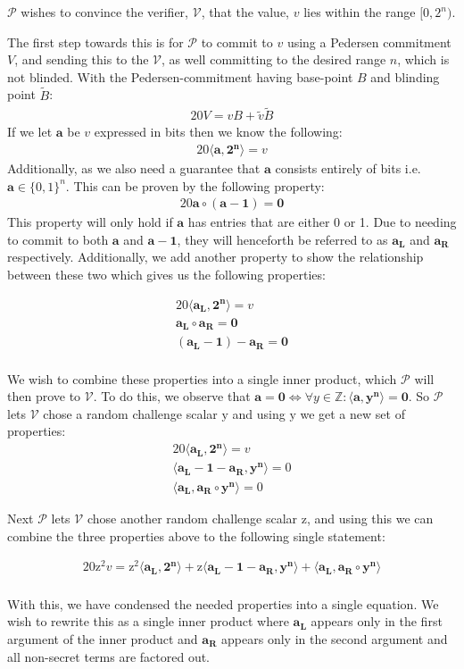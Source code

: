 \documentclass{article}
\newcommand{\eq}[1]{\begin{alignat*}{20}#1\end{alignat*}}
\renewcommand{\vec}[1]{\boldsymbol{#1}}
\newcommand{\ran}[1]{\mathrm{#1}}
\newcommand{\vecran}[1]{\mathbf{#1}}
\newcommand{\V}{\mathcal{V}}
\renewcommand{\P}{\mathcal{P}}
\newcommand{\dotp}[2]{\langle #1, #2 \rangle}
\newcommand{\opn}[1]{\operatorname{#1}}
\newcommand{\vecl}[1]{\vec{#1_{\opn{L}}}}
\newcommand{\vecr}[1]{\vec{#1_{\opn{R}}}}
\newcommand{\blind}[1]{\widetilde{#1}}
\newcommand{\bv}{\blind{v}}
\newcommand{\bB}{\blind{B}}
\begin{document}
$\P$ wishes to convince the verifier, $\V$, that the value, $v$ lies
within the range $[0,2^n)$.

\newpage

The first step towards this is for $\P$ to commit to $v$ using
a Pedersen commitment $V$, and sending this to the $\V$, as well
committing to the desired range $n$, which is not blinded. With the
Pedersen-commitment having base-point $B$ and blinding point $\bB$:
\eq{
	V = vB + \bv \bB
}
If we let $\vec{a}$ be $v$ expressed in bits then we know the following:
\eq{
	\dotp{\vec{a}}{\vec{2^n}} = v
}
Additionally, as we also need a guarantee that $\vec{a}$ consists
entirely of bits i.e. $\vec{a} \in \{0,1\}^n$. This can be
proven by the following property:
\eq{
	\vec{a} \circ (\vec{a} - \vec{1}) = \vec{0}
}
This property will only hold if $\vec{a}$ has entries that are either
0 or 1. Due to needing to commit to both $\vec{a}$ and $\vec{a}
- \vec{1}$, they will henceforth be referred to as $\vecl{a}$ and
$\vecr{a}$ respectively. Additionally, we add another property to
show the relationship between these two which gives us the following
properties:

\eq{
	\dotp{\vecl{a}}{\vec{2^n}} = v \\
	\vecl{a}\circ \vecr{a} = \vec{0} \\
	(\vecl{a} - \vec{1}) - \vecr{a} = \vec{0} \\
}

We wish to combine these properties into a single inner product, which
$\P$ will then prove to $\V$. To do this, we observe that $\vec{a}
= \vec{0} \iff \forall y\in\mathbb{Z}: \dotp{\vec{a}}{\vec{y^n}} =
\vec{0}$. So $\P$ lets $\V$ chose a random challenge scalar $\ran{y}$
and using $\ran{y}$ we get a new set of properties:
\eq{
	\dotp{\vecl{a}}{\vec{2^n}} = v \\
	\dotp{\vecl{a} - \vec{1} - \vecr{a}}{\vecran{y}^{\vec{n}}} = 0 \\
	\dotp{\vecl{a}}{\vecr{a}\circ \vecran{y}^{\vec{n}}} = 0
}

Next $\P$ lets $\V$ chose another random challenge scalar $\ran{z}$,
and using this we can combine the three properties above to the
following single statement:

\eq{
	\ran{z^2}v = 
	\ran{z^2}\dotp{\vecl{a}}{\vec{2^n}} +
	\ran{z}\dotp{\vecl{a} - \vec{1} - \vecr{a}}{\vecran{y}^{\vec{n}}} +
	\dotp{\vecl{a}}{\vecr{a}\circ \vecran{y}^{\vec{n}}} \\
}

With this, we have condensed the needed properties into a single
equation.  We wish to rewrite this as a single inner product where
$\vecl{a}$ appears only in the first argument of the inner product
and $\vecr{a}$ appears only in the second argument and all non-secret
terms are factored out.
\end{document}
